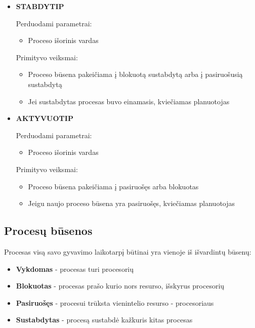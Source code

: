 \documentclass{scrartcl}
\begin{document}
\begin{itemize}
        \item \textbf{STABDYTIP}
          \par
          Perduodami parametrai:
          \begin{itemize}
            \item Proceso išorinis vardas
          \end{itemize}
          Primityvo veiksmai:
          \begin{itemize}
            \item Proceso būsena pakeičiama į blokuotą sustabdytą arba į pasiruošusią sustabdytą
            \item Jei sustabdytas procesas buvo einamasis, kviečiamas planuotojas
          \end{itemize}

        \item \textbf{AKTYVUOTIP}
          \par
          Perduodami parametrai:
          \begin{itemize}
            \item Proceso išorinis vardas
          \end{itemize}
          Primityvo veiksmai:
          \begin{itemize}
            \item Proceso būsena pakeičiama į pasiruošęs arba blokuotas
            \item Jeigu naujo proceso būsena yra pasiruošęs, kviečiamas planuotojas
          \end{itemize}
      \end{itemize}
      \subsection{Procesų būsenos}
        Procesas visą savo gyvavimo laikotarpį būtinai yra vienoje iš išvardintų būsenų:
          \begin{itemize}
              \item \textbf{Vykdomas} - procesas turi procesorių
              \item \textbf{Blokuotas} - procesas prašo kurio nors resurso, išskyrus procesorių
              \item \textbf{Pasiruošęs} - procesui trūksta vienintelio resurso - procesoriaus
              \item \textbf{Sustabdytas} - procesą sustabdė kažkuris kitas procesas
          \end{itemize}
\end{document}
